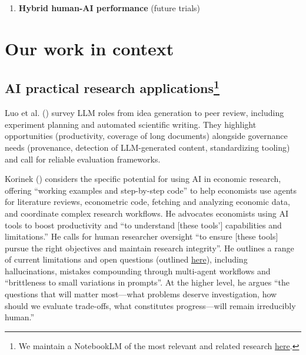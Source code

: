 \documentclass[
  11pt,
  letterpaper,
  DIV=11,
  numbers=noendperiod]{scrreprt}
\providecommand{\tightlist}{%
  \setlength{\itemsep}{0pt}\setlength{\parskip}{0pt}}
\begin{document}
\begin{enumerate}
  \begin{itemize}
  \tightlist
  \item
    Which types of papers and approaches do default models tend to
    `like' more/less relative to humans when given the same guidelines?
  \item
    Do we see signs of characteristic preferences that help us
    understand how AIs are likely to prioritize, conduct, and evaluate
    research?
  \end{itemize}
\item
  \textbf{Hybrid human-AI performance} (future trials)
\end{enumerate}

\section{Our work in context}\label{sec-our-work-in-context}

\subsection[AI practical research applications]{\texorpdfstring{AI
practical research
applications\footnote{We maintain a NotebookLM of the most relevant and
  related research
  \href{https://notebooklm.google.com/notebook/f4dde07a-a1bc-470d-93b2-052a3c795933}{here}.}}{AI practical research applications}}\label{ai-practical-research-applicationsindex-6}

Luo et al. () survey LLM roles from idea
generation to peer review, including experiment planning and automated
scientific writing. They highlight opportunities (productivity, coverage
of long documents) alongside governance needs (provenance, detection of
LLM-generated content, standardizing tooling) and call for reliable
evaluation frameworks.

Korinek () considers the specific
potential for using AI in economic research, offering ``working examples
and step-by-step code'' to help economists use agents for literature
reviews, econometric code, fetching and analyzing economic data, and
coordinate complex research workflows. He advocates economists using AI
tools to boost productivity and ``to understand {[}these tools'{]}
capabilities and limitations.'' He calls for human researcher oversight
``to ensure {[}these tools{]} pursue the right objectives and maintain
research integrity''. He outlines a range of current limitations and
open questions (outlined
\href{https://docs.google.com/document/d/1CVNnG6Jw3gr1sbI9Z_vIIJ1BI9O-8-Eev6D2j22vaeg/edit?tab=t.0\#heading=h.9pcc2azfjlro}{here}),
including hallucinations, mistakes compounding through multi-agent
workflows and ``brittleness to small variations in prompts''. At the
higher level, he argues ``the questions that will matter most---what
problems deserve investigation, how should we evaluate trade-offs, what
constitutes progress---will remain irreducibly human.''
\end{document}
